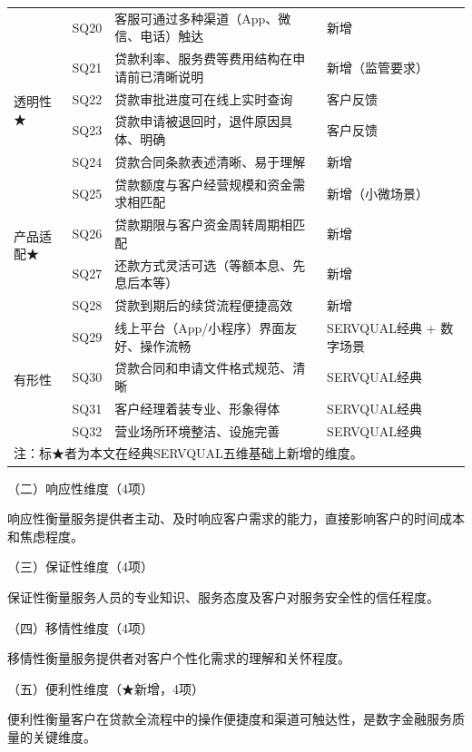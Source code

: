 \begin{table}[htbp]
\begin{tabularx}{\textwidth}{l p{1.2cm} p{7.0cm} p{4.5cm}}
    & SQ20 & 客服可通过多种渠道（App、微信、电话）触达 & 新增 \\
    \cmidrule{2-4}
    \multirow{4}{*}{透明性★} & SQ21 & 贷款利率、服务费等费用结构在申请前已清晰说明 & 新增（监管要求） \\
    & SQ22 & 贷款审批进度可在线上实时查询 & 客户反馈 \\
    & SQ23 & 贷款申请被退回时，退件原因具体、明确 & 客户反馈 \\
    & SQ24 & 贷款合同条款表述清晰、易于理解 & 新增 \\
    \cmidrule{2-4}
    \multirow{4}{*}{产品适配★} & SQ25 & 贷款额度与客户经营规模和资金需求相匹配 & 新增（小微场景） \\
    & SQ26 & 贷款期限与客户资金周转周期相匹配 & 新增 \\
    & SQ27 & 还款方式灵活可选（等额本息、先息后本等） & 新增 \\
    & SQ28 & 贷款到期后的续贷流程便捷高效 & 新增 \\
    \cmidrule{2-4}
    \multirow{4}{*}{有形性} & SQ29 & 线上平台（App/小程序）界面友好、操作流畅 & SERVQUAL经典 + 数字场景 \\
    & SQ30 & 贷款合同和申请文件格式规范、清晰 & SERVQUAL经典 \\
    & SQ31 & 客户经理着装专业、形象得体 & SERVQUAL经典 \\
    & SQ32 & 营业场所环境整洁、设施完善 & SERVQUAL经典 \\
    \bottomrule
    \multicolumn{4}{p{\textwidth}}{\small 注：标★者为本文在经典SERVQUAL五维基础上新增的维度。}
  \end{tabularx}
\end{table}

（二）响应性维度（4项）

响应性衡量服务提供者主动、及时响应客户需求的能力，直接影响客户的时间成本和焦虑程度。\par


（三）保证性维度（4项）

保证性衡量服务人员的专业知识、服务态度及客户对服务安全性的信任程度。\par


（四）移情性维度（4项）

移情性衡量服务提供者对客户个性化需求的理解和关怀程度。\par


（五）便利性维度（★新增，4项）

便利性衡量客户在贷款全流程中的操作便捷度和渠道可触达性，是数字金融服务质量的关键维度。\par


